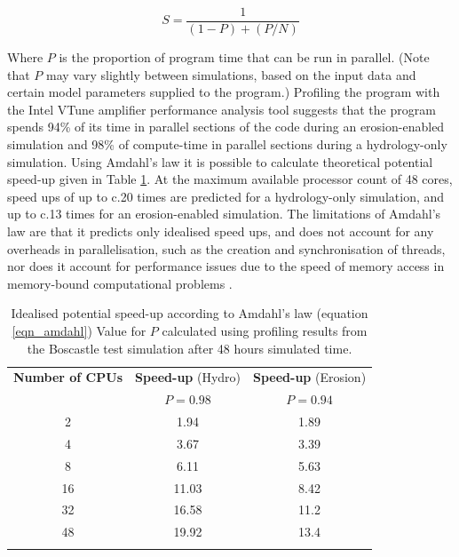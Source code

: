 \begin{equation}
S = \frac{1}{(1-P)+(P/N)}
\label{eqn_amdahl}
\end{equation}

Where \(P\) is the proportion of program time that can be run in parallel. (Note that \(P\) may vary slightly between simulations, based on the input data and certain model parameters supplied to the program.) Profiling the program with the Intel VTune amplifier performance analysis tool suggests that the program spends 94\% of its time in parallel sections of the code during an erosion-enabled simulation and 98\% of compute-time in parallel sections during a hydrology-only simulation. Using Amdahl's law it is possible to calculate theoretical potential speed-up given in Table \ref{Amdahl_table}. At the maximum available processor count of 48 cores, speed ups of up to c.20 times are predicted for a hydrology-only simulation, and up to c.13 times for an erosion-enabled simulation. The limitations of Amdahl's law are that it predicts only idealised speed ups, and does not account for any overheads in parallelisation, such as the creation and synchronisation of threads, nor does it account for performance issues due to the speed of memory access in memory-bound computational problems \citep{hill2008amdahl,sun2010reevaluating}.

\begin{table}
\caption{Idealised potential speed-up according to Amdahl's law (equation \ref{eqn_amdahl}) Value for \(P\) calculated using profiling results from the Boscastle test simulation after 48 hours simulated time.}
\begin{tabular}{ccc}
\textbf{Number of CPUs} & \textbf{Speed-up} (Hydro) & \textbf{Speed-up} (Erosion) \\

 & \(P=0.98\) & \(P=0.94\) \\
\hline 
2 & 1.94 & 1.89  \\ 
4 & 3.67 & 3.39  \\ 
8 & 6.11 &5.63  \\ 
16 & 11.03 & 8.42 \\ 
32 & 16.58 & 11.2 \\ 
48 & 19.92 & 13.4 \\ 
\hline \\
\end{tabular}

\label{Amdahl_table} 
\end{table}



